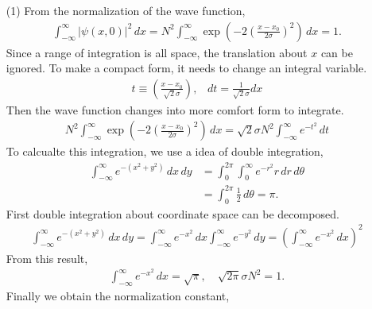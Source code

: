 \documentclass[floatfix,nofootinbib,superscriptaddress,fleqn]{revtex4}
\begin{document}
\begin{itemize}
  \item[(1)] From the normalization of the wave function,
  \begin{align}
    \int_{-\infty}^{\infty} |\psi(x,0)|^2\,dx=N^2\int_{-\infty}^{\infty}
    \exp\left(-2{\left(\frac{x-x_0}{2\sigma}\right)}^2\right) \,dx =1.
  \end{align}
Since a range of integration is all space, the translation 
about $x$ can be ignored.
To make a compact form, it needs to change an integral variable.
  \begin{align}
    t \equiv \left(\frac{x-x_0}{\sqrt{2}\sigma}\right),\;\;\; dt 
    = \frac{1}{\sqrt{2}\sigma} dx 
  \end{align}
Then the wave function changes into more comfort form to integrate.
  \begin{align}
    N^2\int_{-\infty}^{\infty}\exp\left(-2{\left(
      \frac{x-x_0}{2\sigma}\right)}^2\right) \,dx
    =\sqrt{2}\sigma N^2\int_{-\infty}^{\infty} e^{-t^2} \,dt
  \end{align}
To calcualte this integration, we use a idea of double integration,
  \begin{align}
    \int_{-\infty}^{\infty} e^{-(x^2+y^2)}\,dx\,dy 
    &= \int_{0}^{2\pi}\int_{0}^{\infty} e^{-r^2}r\,dr\,d\theta
    \\   &= \int_{0}^{2\pi}\frac{1}{2}\,d\theta = \pi.
  \end{align}
First double integration about coordinate space can be decomposed.
  \begin{align}
    \int_{-\infty}^{\infty} e^{-(x^2+y^2)}\,dx\,dy 
    = \int_{-\infty}^{\infty} e^{-x^2}\,dx\int_{-\infty}^{\infty}e^{-y^2}\,dy
    = \left(\int_{-\infty}^{\infty} e^{-x^2}\,dx\right)^2
  \end{align}
From this result,
  \begin{align}
    \int_{-\infty}^{\infty} e^{-x^2} \,dx 
    = \sqrt{\pi},\quad \sqrt{2\pi}\sigma N^2 =1.
  \end{align}
Finally we obtain the normalization constant,

\end{itemize}
\end{document}
